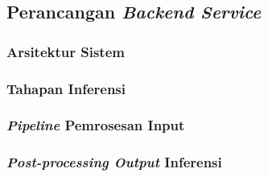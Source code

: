 \subsection{Perancangan \emph{Backend Service}}
\label{subsec:perancangan-fallback-mechanism}

\subsubsection{Arsitektur Sistem}
\label{subsubsec:arsitektur-sistem}

\label{subsubsubsec:konfigurasi-sistem}

\label{subsubsubsec:struktur-direktori-sistem}

\subsubsubsection{}

\subsubsection{Tahapan Inferensi}
\label{subsubsec:proses-inferensi}

\label{subsubsubsec:pemrosesan-model}

\subsubsection{\emph{Pipeline} Pemrosesan Input}
\label{subsubsec:pipeline-pemrosesan-input}

\label{subsubsubsec:proses-ekstraksi-data}

\subsubsection{\emph{Post-processing Output} Inferensi}
\label{subsubsec:post-processing-output-inferensi}

\label{subsubsubsec:pembersihan-output}

\label{subsubsubsec:pengolahan-output}
